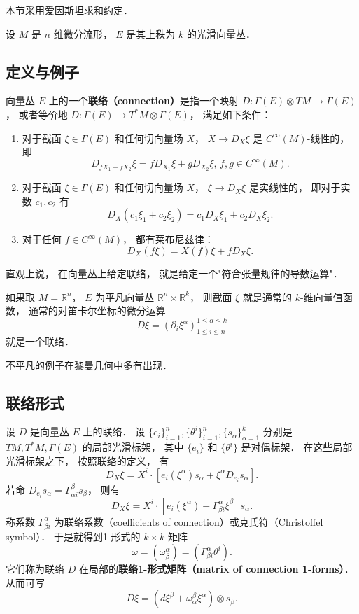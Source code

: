 
本节采用爱因斯坦求和约定．

设 $M$ 是 $n$ 维微分流形， $E$ 是其上秩为 $k$ 的光滑向量丛． 

\subsection{定义与例子}
向量丛 $E$ 上的一个\textbf{联络（connection）}是指一个映射 $D:\Gamma(E)\otimes TM\to\Gamma(E)$， 或者等价地 $D:\Gamma(E)\to T^*M\otimes\Gamma(E)$， 满足如下条件：

\begin{enumerate}
\item 对于截面 $\xi\in\Gamma(E)$ 和任何切向量场 $X$， $X\to D_X\xi$ 是 $C^\infty(M)$-线性的， 即
$$
D_{fX_1+fX_2}\xi=fD_{X_1}\xi+gD_{X_2}\xi,\,f,g\in C^\infty(M).
$$
\item 对于截面 $\xi\in\Gamma(E)$ 和任何切向量场 $X$， $\xi\to D_X\xi$ 是实线性的， 即对于实数 $c_1,c_2$ 有
$$
D_X(c_1\xi_1+c_2\xi_2)=c_1D_X\xi_1+c_2D_X\xi_2.
$$
\item 对于任何 $f\in C^\infty(M)$， 都有莱布尼兹律：
$$
D_X(f\xi)=X(f)\xi+fD_X\xi.
$$
\end{enumerate}

直观上说， 在向量丛上给定联络， 就是给定一个"符合张量规律的导数运算"． 

如果取 $M=\mathbb{R}^n$， $E$ 为平凡向量丛 $\mathbb{R}^n\times\mathbb{R}^k$， 则截面 $\xi$ 就是通常的 $k$-维向量值函数， 通常的对笛卡尔坐标的微分运算
$$
D\xi=(\partial_i\xi^\alpha)_{1\leq i\leq n}^{1\leq\alpha\leq k}
$$
就是一个联络．

不平凡的例子在黎曼几何中多有出现．

\subsection{联络形式}
设 $D$ 是向量丛 $E$ 上的联络． 设 $\{e_i\}_{i=1}^n,\{\theta^i\}_{i=1}^n,\{s_\alpha\}_{\alpha=1}^k$ 分别是 $TM,T^*M,\Gamma(E)$ 的局部光滑标架， 其中 $\{e_i\}$ 和 $\{\theta^i\}$ 是对偶标架． 在这些局部光滑标架之下， 按照联络的定义， 有
$$
D_X\xi=X^i\cdot\left[e_i(\xi^\alpha)s_\alpha+\xi^\alpha D_{e_i}s_\alpha\right].
$$
若命 $D_{e_i}s_\alpha=\Gamma_{\alpha i}^\beta s_\beta$， 则有
$$
D_X\xi=X^i\cdot\left[e_i(\xi^\alpha)+\Gamma_{\beta i}^\alpha\xi^\beta \right]s_\alpha.
$$
称系数 $\Gamma^\alpha_{\beta i}$ 为联络系数（coefficients of connection）或克氏符（Christoffel symbol）． 于是就得到1-形式的 $k\times k$ 矩阵
$$
\omega=(\omega_\beta^\alpha)=(\Gamma_{\beta i}^\alpha\theta^i).
$$
它们称为联络 $D$ 在局部的\textbf{联络1-形式矩阵（matrix of connection 1-forms）}． 从而可写
$$
D\xi=(d\xi^\beta+\omega_\alpha^\beta\xi^\alpha)\otimes s_\beta.
$$

